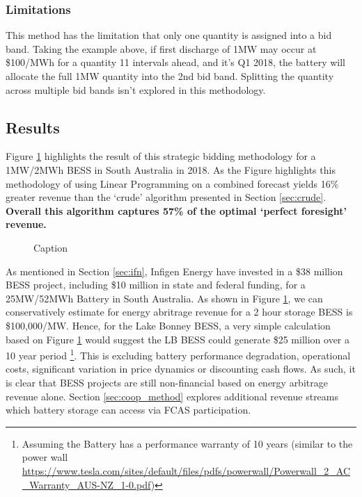 \subsubsection{Limitations}
This method has the limitation that only one quantity is assigned into a bid band. Taking the example above, if first discharge of 1MW may occur at \$100/MWh for a quantity 11 intervals ahead, and it's Q1 2018, the battery will allocate the full 1MW quantity into the 2nd bid band. Splitting the quantity across multiple bid bands isn't explored in this methodology.
\newpage
\subsection{Results}
\label{sec:strategic_bidding}
Figure \ref{fig:strategic_bidding}  highlights the result of this strategic bidding methodology for a 1MW/2MWh BESS in South Australia in 2018. As the Figure highlights this methodology of using Linear Programming on a combined forecast yields 16\% greater revenue than the `crude' algorithm presented in Section \ref{sec:crude}. \textbf{ Overall this algorithm captures 57\% of the optimal `perfect foresight' revenue. }
\begin{figure}[H]
    \centering
    \caption{Caption}
    \label{fig:strategic_bidding}
\end{figure}
As mentioned in Section \ref{sec:ifn}, Infigen Energy have invested in a \$38 million BESS project, including \$10 million in state and federal funding, for a 25MW/52MWh Battery in South Australia. As shown in Figure \ref{fig:strategic_bidding}, we can conservatively estimate for energy abritrage revenue for a 2 hour storage BESS is \$100,000/MW. Hence, for the Lake Bonney BESS, a very simple calculation based on Figure \ref{fig:strategic_bidding} would suggest the LB BESS could generate \$25 million over a 10 year period \footnote{Assuming the Battery has a performance warranty of 10 years (similar to the power wall \url{https://www.tesla.com/sites/default/files/pdfs/powerwall/Powerwall_2_AC_Warranty_AUS-NZ_1-0.pdf})}. This is excluding battery performance degradation, operational costs, significant variation in price dynamics or discounting cash flows. As such, it is clear that BESS projects are still non-financial based on energy arbitrage revenue alone. Section \ref{sec:coop_method} explores additional revenue streams which battery storage can access via FCAS participation. 

